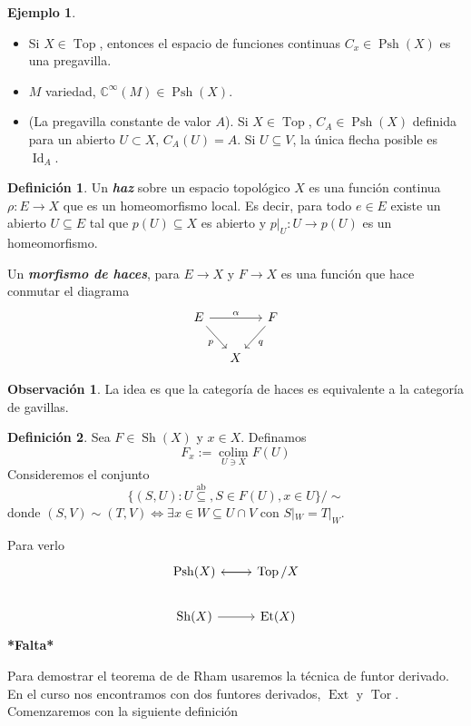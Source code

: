 \documentclass[spanish]{book}
\theoremstyle{definition}
\newtheorem*{defn}{Definición}
\newtheorem*{obs}{Observación}
\newtheorem*{ejem}{Ejemplo}
\newcommand{\C}{\mathbb{C}}
\DeclareMathOperator{\Id}{Id}
\DeclareMathOperator{\Ext}{Ext}
\DeclareMathOperator{\Tor}{Tor}
\begin{document}
\begin{ejem}\leavevmode
	\begin{itemize}
		\item Si $X\in\operatorname{Top}$, entonces el espacio de funciones continuas $C_x\in\operatorname{Psh}(X)$ es una pregavilla.
		\item $M$ variedad, $\C^\infty(M)\in\operatorname{Psh}(X)$.
		\item (La pregavilla constante de valor $A$). Si $X\in\operatorname{Top}$, $C_A\in\operatorname{Psh}(X)$ definida para un abierto $U\subset X$, $C_A(U)=A$. Si $U\subseteq V$, la única flecha posible es $\Id_A$.
	\end{itemize}
\end{ejem}
\begin{defn}
	Un \textbf{\textit{haz}} sobre un espacio topológico $X$ es una función continua $\rho:E\to X$ que es un homeomorfismo local. Es decir, para todo $e\in E$ existe un abierto $U\subseteq E$ tal que $p(U)\subseteq X$ es abierto y $p|_U:U\to p(U)$ es un homeomorfismo.
	
	Un \textbf{\textit{morfismo de haces}}, para $E\to X$ y $F\to X$ es una función que hace conmutar el diagrama
	\[\begin{tikzcd}[column sep=small]
		E\arrow[rr,"\alpha"]\arrow[dr,"p",swap]&&F\arrow[dl,"q"]\\
		&X
	\end{tikzcd}\]
\end{defn}
\begin{obs}
	La idea es que la categoría de haces es equivalente a la categoría de gavillas.
\end{obs}
\begin{defn}
	Sea $F\in\operatorname{Sh}(X)$ y $x\in X$. Definamos
	\[F_x:=\underset{U\ni X}{\operatorname{colim}}F(U)\]
	Consideremos el conjunto
	\[\{(S,U):U\overset{\operatorname{ab}}{\subseteq},S\in F(U),x\in U\}\big/\sim\]
	donde $(S,V)\sim(T,V)\iff\exists x\in W\subseteq U\cap V$ con $S|_W=T|_W$.
\end{defn}
Para verlo
\[\begin{tikzcd}
	\operatorname{Psh}(X)\arrow[r]&\operatorname{Top}/X\arrow[l,shift only]\\
	\operatorname{Sh}(X)\arrow[r]&\operatorname{Et}(X)
\end{tikzcd}\]
\textbf{*Falta*}

Para demostrar el teorema de de Rham usaremos la técnica de funtor derivado. En el curso nos encontramos con dos funtores derivados, $\Ext$ y $\Tor$. Comenzaremos con la siguiente definición
\end{document}
